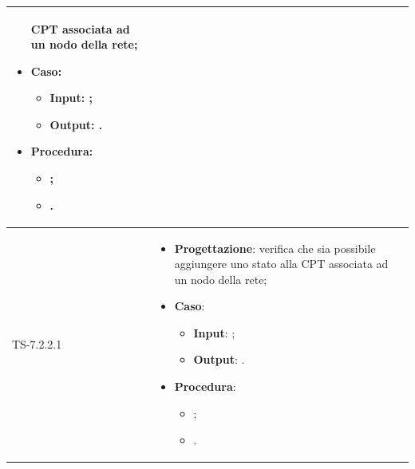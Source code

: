 \begin{longtable}{|C{2.5cm}|C{13cm}|}
\begin{itemize}
	CPT associata ad un nodo della rete;
	\item \textbf{Caso}: 
	\begin{itemize}
		\item \textbf{Input}: ;
		\item \textbf{Output}: .
	\end{itemize}
	\item \textbf{Procedura}:
	\begin{itemize}
		\item ;
		\item .
	\end{itemize} 
\end{itemize}
	 \\
	\hline
	{TS-7.2.2.1} &
\begin{itemize}
	\item \textbf{Progettazione}: verifica che sia possibile aggiungere uno
	stato alla CPT associata ad un nodo della rete;
	\item \textbf{Caso}: 
	\begin{itemize}
		\item \textbf{Input}: ;
		\item \textbf{Output}: .
	\end{itemize}
	\item \textbf{Procedura}:
	\begin{itemize}
		\item ;
		\item .
	\end{itemize} 
\end{itemize}
	 

\end{longtable}
